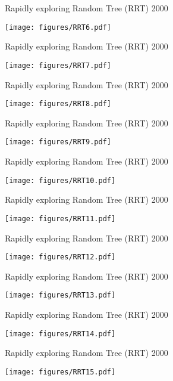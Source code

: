 \begin{frame} {Rapidly exploring Random Tree (RRT) 2000}
\centerline {
  \texttt{[image: figures/RRT6.pdf]}
}
\end{frame}

\begin{frame} {Rapidly exploring Random Tree (RRT) 2000}
\centerline {
  \texttt{[image: figures/RRT7.pdf]}
}
\end{frame}

\begin{frame} {Rapidly exploring Random Tree (RRT) 2000}
\centerline {
  \texttt{[image: figures/RRT8.pdf]}
}
\end{frame}

\begin{frame} {Rapidly exploring Random Tree (RRT) 2000}
\centerline {
  \texttt{[image: figures/RRT9.pdf]}
}
\end{frame}

\begin{frame} {Rapidly exploring Random Tree (RRT) 2000}
\centerline {
  \texttt{[image: figures/RRT10.pdf]}
}
\end{frame}

\begin{frame} {Rapidly exploring Random Tree (RRT) 2000}
\centerline {
  \texttt{[image: figures/RRT11.pdf]}
}
\end{frame}

\begin{frame} {Rapidly exploring Random Tree (RRT) 2000}
\centerline {
  \texttt{[image: figures/RRT12.pdf]}
}
\end{frame}

\begin{frame} {Rapidly exploring Random Tree (RRT) 2000}
\centerline {
  \texttt{[image: figures/RRT13.pdf]}
}
\end{frame}

\begin{frame} {Rapidly exploring Random Tree (RRT) 2000}
\centerline {
  \texttt{[image: figures/RRT14.pdf]}
}
\end{frame}

\begin{frame} {Rapidly exploring Random Tree (RRT) 2000}
\centerline {
  \texttt{[image: figures/RRT15.pdf]}
}
\end{frame}

